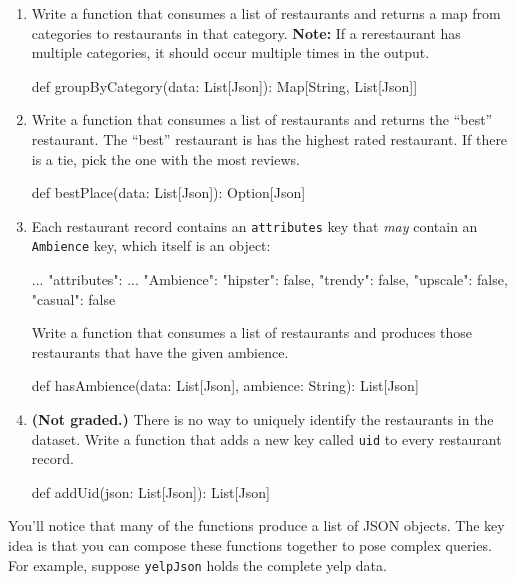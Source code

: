 \documentclass[9pt]{extbook}
\begin{document}
\begin{enumerate}
    \item Write a function that consumes a list of restaurants and returns a
    map from categories to restaurants in that category.
    \textbf{Note:} If a rerestaurant has multiple categories, it should
    occur multiple times in the output.
    \begin{scalacode}
    def groupByCategory(data: List[Json]): Map[String, List[Json]]
    \end{scalacode}

    \item Write a function that consumes a list of restaurants and returns the
    ``best'' restaurant. The ``best'' restaurant is has the highest rated
    restaurant. If there is a tie, pick the one with the most reviews.
    \begin{scalacode}
    def bestPlace(data: List[Json]): Option[Json]
    \end{scalacode}

    \item Each restaurant record contains an \texttt{attributes} key that
    \textit{may} contain an \texttt{Ambience} key, which
    itself is an object:
    \begin{scalacode}
    {   ...
        "attributes": {
            ...
            "Ambience": {
                "hipster": false,
                "trendy": false,
                "upscale": false,
                "casual": false
            }
        }
    }
    \end{scalacode}
    Write a function that consumes a list of restaurants and produces those
    restaurants that have the given ambience.
    \begin{scalacode}
    def hasAmbience(data: List[Json], ambience: String): List[Json]
    \end{scalacode}

    \item \textbf{(Not graded.)} There
    is no way to uniquely identify the restaurants in the dataset. 
    Write a function that adds a
    new key called \verb|uid| to every restaurant record.
    \begin{scalacode}
    def addUid(json: List[Json]): List[Json]
    \end{scalacode}

\end{enumerate}

You'll notice that many of the functions produce a list of JSON
objects. The key idea is that you can compose these functions together to
pose complex queries. For example, suppose \texttt{yelpJson} holds the
complete yelp data.
\end{document}
